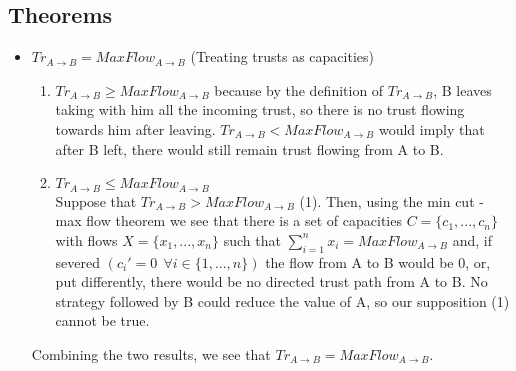 \documentclass[11pt]{article}
\begin{document}
\begin{enumerate}
  \section*{Theorems}
    \begin{itemize}
    \item $Tr_{A \rightarrow B} = MaxFlow_{A \rightarrow B}$ (Treating trusts as capacities) 
    \begin{enumerate}
       \item $Tr_{A \rightarrow B} \geq MaxFlow_{A \rightarrow B}$ because by the definition of $Tr_{A \rightarrow B}$,
       B leaves taking with him all the incoming trust, so there is no trust flowing towards him after leaving.
       $Tr_{A \rightarrow B} < MaxFlow_{A \rightarrow B}$ would imply that after B left, there would still remain trust
       flowing from A to B.
       \item $Tr_{A \rightarrow B} \leq MaxFlow_{A \rightarrow B}$ \\
       Suppose that $Tr_{A \rightarrow B} > MaxFlow_{A \rightarrow B}$ (1). Then, using the min cut - max flow theorem we
       see that there is a set of capacities $C= \{c_1,...,c_n\}$ with flows $X = \{x_1,...,x_n\}$ such that
       $\sum_{i=1}^{n}{x_i} = MaxFlow_{A \rightarrow B}$ and, if severed $(c_i' = 0\:\:\forall i \in \{1,...,n\})$ the flow
       from A to B would be $0$, or, put differently, there would be no directed trust path from A to B. No strategy
       followed by B could reduce the value of A, so our supposition (1) cannot be true.
    \end{enumerate}
    Combining the two results, we see that $Tr_{A \rightarrow B} = MaxFlow_{A \rightarrow B}$.
    

\end{itemize}
\end{enumerate}
\end{document}
